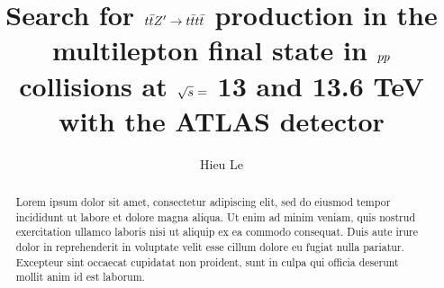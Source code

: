 \documentclass{msuphddissertation}
\author{Hieu Le} %
\title{Search for $\lowercase{\ttbar}Z' \rightarrow \lowercase{\tttt}$ production in the multilepton final state in $\lowercase{pp}$ collisions at \lowercase{$\sqrt{s}=$} 13 and 13.6 TeV with the ATLAS detector} %
\begin{document}
\maketitlepage %


\begin{abstract}
Lorem ipsum dolor sit amet, consectetur adipiscing elit, sed do eiusmod tempor incididunt ut labore et dolore magna aliqua. Ut enim ad minim veniam, quis nostrud exercitation ullamco laboris nisi ut aliquip ex ea commodo consequat. Duis aute irure dolor in reprehenderit in voluptate velit esse cillum dolore eu fugiat nulla pariatur. Excepteur sint occaecat cupidatat non proident, sunt in culpa qui officia deserunt mollit anim id est laborum.
\end{abstract}




\end{document}
